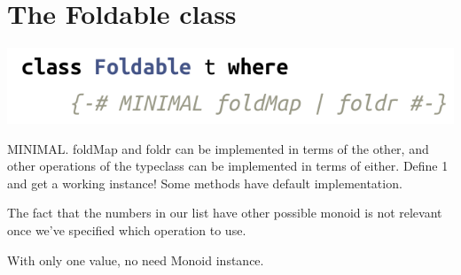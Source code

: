 \documentclass{article}
\title{}
\date{}
\author{}
\newcounter{Def}[section]
\begin{document}
\section{The {\selectfont Foldable} class}
\includegraphics[width = 6 cm]{./Foldable.png}

  {\selectfont MINIMAL.}  {\selectfont foldMap} and {\selectfont foldr} can be implemented in terms of the other, and other operations of the typeclass can be implemented in terms of either. Define 1 and get a working instance! Some methods have default implementation.

  
  The fact that the numbers in our list have other possible monoid is not relevant once we've specified which operation to use.

  With only one value, no need {\selectfont Monoid} instance.
\end{document}
